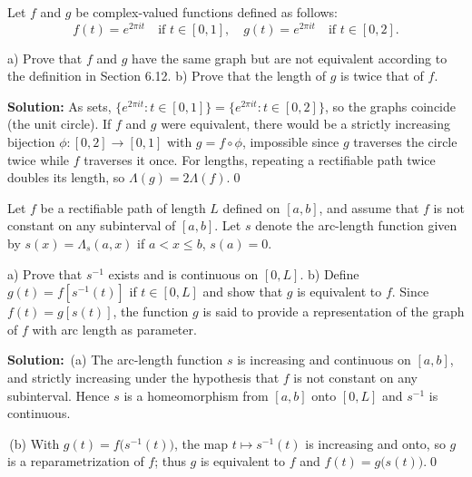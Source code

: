 \begin{problembox}
Let $f$ and $g$ be complex-valued functions defined as follows:
\[f(t) = e^{2\pi it} \quad \text{if } t \in [0, 1], \quad g(t) = e^{2\pi it} \quad \text{if } t \in [0, 2].\]

a) Prove that $f$ and $g$ have the same graph but are not equivalent according to the definition in Section 6.12.
b) Prove that the length of $g$ is twice that of $f$.
\end{problembox}

\noindent\textbf{Solution:}
As sets, $\{e^{2\pi it}:t\in[0,1]\}=\{e^{2\pi it}:t\in[0,2]\}$, so the graphs coincide (the unit circle). If $f$ and $g$ were equivalent, there would be a strictly increasing bijection $\phi:[0,2]\to[0,1]$ with $g=f\circ\phi$, impossible since $g$ traverses the circle twice while $f$ traverses it once. For lengths, repeating a rectifiable path twice doubles its length, so $\Lambda(g)=2\Lambda(f)$.\qed


\begin{problembox}
Let $f$ be a rectifiable path of length $L$ defined on $[a, b]$, and assume that $f$ is not constant on any subinterval of $[a, b]$. Let $s$ denote the arc-length function given by $s(x) = \Lambda_s(a, x)$ if $a < x \leq b$, $s(a) = 0$.

a) Prove that $s^{-1}$ exists and is continuous on $[0, L]$.
b) Define $g(t) = f[s^{-1}(t)]$ if $t \in [0, L]$ and show that $g$ is equivalent to $f$. Since $f(t) = g[s(t)]$, the function $g$ is said to provide a representation of the graph of $f$ with arc length as parameter.
\end{problembox}

\noindent\textbf{Solution:}
\,(a) The arc-length function $s$ is increasing and continuous on $[a,b]$, and strictly increasing under the hypothesis that $f$ is not constant on any subinterval. Hence $s$ is a homeomorphism from $[a,b]$ onto $[0,L]$ and $s^{-1}$ is continuous.

\,(b) With $g(t)=f\big(s^{-1}(t)\big)$, the map $t\mapsto s^{-1}(t)$ is increasing and onto, so $g$ is a reparametrization of $f$; thus $g$ is equivalent to $f$ and $f(t)=g\big(s(t)\big)$.\qed


